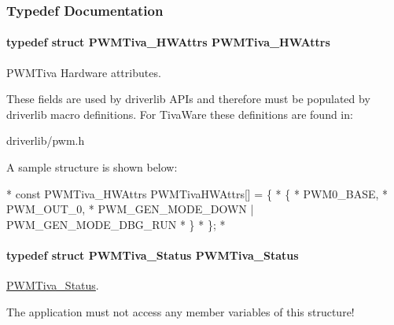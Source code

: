 \subsubsection{Typedef Documentation}
\paragraph[{P\-W\-M\-Tiva\-\_\-\-H\-W\-Attrs}]{\setlength{\rightskip}{0pt plus 5cm}typedef struct {\bf P\-W\-M\-Tiva\-\_\-\-H\-W\-Attrs}  {\bf P\-W\-M\-Tiva\-\_\-\-H\-W\-Attrs}}\label{_p_w_m_tiva_8h_a9dc35e1e545e80c16d6ac60c101e2143}


P\-W\-M\-Tiva Hardware attributes. 

These fields are used by driverlib A\-P\-Is and therefore must be populated by driverlib macro definitions. For Tiva\-Ware these definitions are found in\-:
\begin{DoxyItemize}
\item driverlib/pwm.\-h
\end{DoxyItemize}

A sample structure is shown below\-: 
\begin{DoxyCode}
*  \textcolor{keyword}{const} PWMTiva_HWAttrs PWMTivaHWAttrs[] = \{
*      \{
*          PWM0\_BASE,
*          PWM\_OUT\_0,
*          PWM\_GEN\_MODE\_DOWN | PWM\_GEN\_MODE\_DBG\_RUN
*      \}
*  \};
*  
\end{DoxyCode}
\paragraph[{P\-W\-M\-Tiva\-\_\-\-Status}]{\setlength{\rightskip}{0pt plus 5cm}typedef struct {\bf P\-W\-M\-Tiva\-\_\-\-Status}  {\bf P\-W\-M\-Tiva\-\_\-\-Status}}\label{_p_w_m_tiva_8h_a76a48f3f7fa2bec8b163b5dc1e5301ee}


\hyperlink{struct_p_w_m_tiva___status}{P\-W\-M\-Tiva\-\_\-\-Status}. 

The application must not access any member variables of this structure! 
